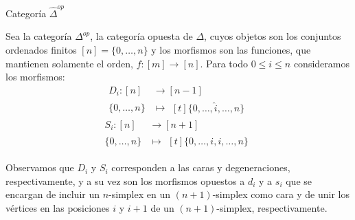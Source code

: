 \documentclass[../main.tex]{subfiles}
\begin{document}
\begin{defi}
    Categor\'ia $\hat{\Delta}^{op}$
\end{defi}
Sea la categor\'ia $\Delta^{op}$, la categor\'ia opuesta de $\Delta$, cuyos objetos son los conjuntos ordenados finitos $[n] = \{0,\dots,n\}$ y los morfismos son las funciones, que mantienen solamente el orden, $f: [m] \to [n]$.
Para todo $0\le i \le n$ consideramos los morfismos:
\begin{align*}
    D_i: [n]      & \longrightarrow [n-1] \\
    \{0,\dots,n\} & \longmapsto\!
    \begin{aligned}[t]
        \{0,\dots, \hat{i}, \dots,n\}
    \end{aligned}
\end{align*}
\begin{align*}
    S_i: [n]      & \longrightarrow [n+1] \\
    \{0,\dots,n\} & \longmapsto\!
    \begin{aligned}[t]
        \{0,\dots, i,i, \dots,n\}
    \end{aligned}
\end{align*}

Observamos que $D_i$ y $S_i$ corresponden a las caras y degeneraciones, respectivamente, y a su vez son los morfismos opuestos a $d_i$ y a $s_i$ que se encargan de incluir un $n$-simplex en un $(n+1)$-simplex como cara y de unir los v\'ertices en las posiciones $i$ y $i+1$ de un $(n+1)$-simplex, respectivamente.
\end{document}
